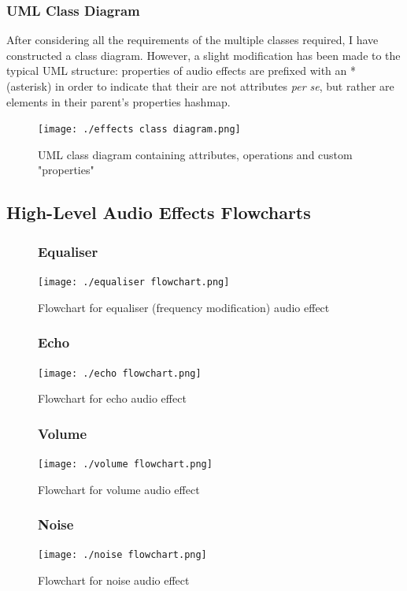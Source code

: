 \subsubsection{UML Class Diagram}
After considering all the requirements of the multiple classes required, I have constructed a class diagram. However, a slight modification has been made to the typical UML structure: properties of audio effects are prefixed with an * (asterisk) in order to indicate that their are not attributes {\it per se}, but rather are elements in their parent's properties hashmap.

\begin{figure}[h]
	\texttt{[image: ./effects class diagram.png]}
	\caption{UML class diagram containing attributes, operations and custom "properties"}
\end{figure}

\pagebreak

\subsection{High-Level Audio Effects Flowcharts}
\begin{figure}[H]
	\subsubsection{Equaliser}
	\texttt{[image: ./equaliser flowchart.png]}
	\caption{Flowchart for equaliser (frequency modification) audio effect}
\end{figure}

\begin{figure}[H]
	\subsubsection{Echo}
	\texttt{[image: ./echo flowchart.png]}
	\caption{Flowchart for echo audio effect}
\end{figure}

\begin{figure}[H]
	\subsubsection{Volume}
	\texttt{[image: ./volume flowchart.png]}
	\caption{Flowchart for volume audio effect}
\end{figure}

\begin{figure}[H]
	\subsubsection{Noise}
	\texttt{[image: ./noise flowchart.png]}
	\caption{Flowchart for noise audio effect}
\end{figure}

